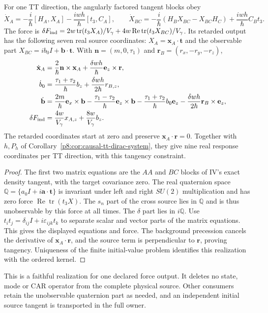 \documentclass[12pt,a4paper]{article}
\begin{document}
\begin{proposition}
\label{p8:prop:first-tt-real-realization}
For one TT direction, the angularly factored tangent blocks obey
\[
 \dot X_A=-\frac i\hbar[H_A,X_A]
                   -\frac{iwh}{\hbar}[t_3,C_A],\qquad
 \dot X_{BC}=-\frac i\hbar(H_BX_{BC}-X_{BC}H_C)
                   +\frac{iwh}{\hbar}C_Bt_3.
\]
The force is
$\delta F_{\rm ind}=2w\operatorname{tr}(t_3X_A)/V_\gamma+
4w\operatorname{Re}\operatorname{tr}(t_3X_{BC})/V_\gamma$.
Its retarded output has the following seven real source coordinates:
$X_A=\mathbf x_A\cdot\mathbf t$ and the observable part
$X_{BC}=ib_0I+\mathbf b\cdot\mathbf t$. With
$\mathbf n=(m,0,\tau_1)$ and $\mathbf r_B=(r_x,-r_y,-r_z)$,
\begin{align*}
 \dot{\mathbf x}_A&=\frac2\hbar\mathbf n\times\mathbf x_A
                     +\frac{\delta wh}{\hbar}\mathbf e_z\times\mathbf r,\\
 \dot b_0&=\frac{\tau_1+\tau_2}{\hbar}b_z
                     +\frac{\delta wh}{2\hbar}r_{B,z},\\
 \dot{\mathbf b}&=\frac{2m}{\hbar}\mathbf e_x\times\mathbf b
     -\frac{\tau_1-\tau_2}{\hbar}\mathbf e_z\times\mathbf b
     -\frac{\tau_1+\tau_2}{\hbar}b_0\mathbf e_z
     -\frac{\delta wh}{2\hbar}\mathbf r_B\times\mathbf e_z,\\
 \delta F_{\rm ind}&=\frac{4w}{V_\gamma}x_{A,z}
                                      +\frac{8w}{V_\gamma}b_z.
\end{align*}
The retarded coordinates start at zero and preserve
$\mathbf x_A\cdot\mathbf r=0$. Together with $h,P_h$ of
Corollary~\ref{p8:cor:causal-tt-dirac-system}, they give nine real response
coordinates per TT direction, with this tangency constraint.
\end{proposition}
\begin{proof}
The first two matrix equations are the $AA$ and $BC$ blocks of IV's exact
density tangent, with the target covariance zero. The real quaternion
space $\mathbb Q=\{a_0I+i\mathbf a\cdot\mathbf t\}$ is invariant under
left and right $SU(2)$ multiplication and has zero force
$\operatorname{Re}\operatorname{tr}(t_3X)$. The $s_n$ part of the cross
source lies in $\mathbb Q$ and is thus unobservable by this force at all
times. The $\delta$ part lies in $i\mathbb Q$.
Use $t_it_j=\delta_{ij}I+i\varepsilon_{ijk}t_k$ to separate scalar and
vector parts of the matrix equations. This gives the displayed equations
and force. The background precession cancels the derivative of
$\mathbf x_A\cdot\mathbf r$, and the source term is perpendicular to
$\mathbf r$, proving tangency. Uniqueness of the finite initial-value
problem identifies this realization with the ordered kernel.
\end{proof}
This is a faithful realization for one declared force output. It deletes
no state, mode or CAR operator from the complete physical source. Other
consumers retain the unobservable quaternion part as needed, and an
independent initial source tangent is transported in the full owner.
\end{document}

